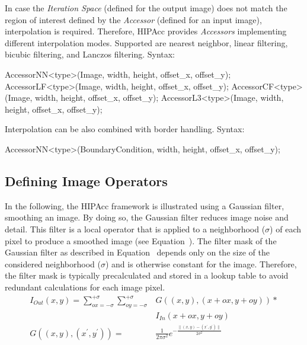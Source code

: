 \begin{itemize}
    In case the {\em Iteration Space} (defined for the output image) does not
    match the region of interest defined by the {\em Accessor} (defined for an
    input image), interpolation is required. Therefore, \ac{HIPAcc} provides
    {\em Accessors} implementing different interpolation modes. Supported are
    nearest neighbor, linear filtering, bicubic filtering, and Lanczos
    filtering. Syntax:\\
\begin{code}
AccessorNN<type>(Image, width, height, offset_x, offset_y);
AccessorLF<type>(Image, width, height, offset_x, offset_y);
AccessorCF<type>(Image, width, height, offset_x, offset_y);
AccessorL3<type>(Image, width, height, offset_x, offset_y);
\end{code}

    Interpolation can be also combined with border handling. Syntax:\\
\begin{code}
AccessorNN<type>(BoundaryCondition, width, height, offset_x, offset_y);
\end{code}
\end{itemize}


%
%
\subsection{Defining Image Operators}\label{sec:framework:kernels}
In the following, the \ac{HIPAcc} framework is illustrated using a Gaussian filter, smoothing an image. By doing so, the Gaussian filter reduces image noise and detail. This filter is a local operator that is applied to a neighborhood ($\sigma$) of each pixel to produce a smoothed image (see Equation~). The filter mask of the Gaussian filter as described in Equation~ depends only on the size of the considered neighborhood ($\sigma$) and is otherwise constant for the image. Therefore, the filter mask is typically precalculated and stored in a lookup table to avoid redundant calculations for each image pixel.
\begin{align}
    I_{Out}(x,y) = \sum_{ox=-\sigma}^{+\sigma} \sum_{oy=-\sigma}^{+\sigma} &G((x,y),(x+ox,y+oy)) *\nonumber\\
                                                                       &I_{In}(x+ox,y+oy) \label{eq:01} \\[2ex]
    G((x,y),(x^\prime,y^\prime)) = &\frac{1}{2\pi \sigma^2} e^{-\frac{\|(x,y) - (x^\prime,y^\prime)\|}{2 \sigma^2}} \label{eq:02}
\end{align}

